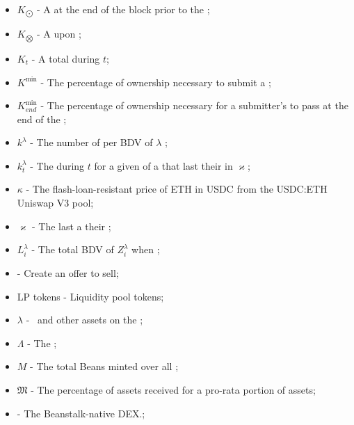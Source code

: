 \documentclass[class=article, crop=false]{standalone}
\begin{document}
\begin{itemize}[topsep=0pt, itemsep=3pt,leftmargin=16pt]
    \item[] $K_{\bigodot}$ - \hypertarget{ht116}{A   at the end of the block prior to the };
    \item[] $K_{\bigotimes}$ - \hypertarget{ht117}{A   upon };
    \item[] $K_t$ - \hypertarget{ht118}{A  total  during $t$};
    \item[] $K^{\text{min}}$ - \hypertarget{ht119}{The percentage of  ownership necessary to submit a };
    \item[] $K_{end}^{\text{min}}$ - The percentage of  ownership necessary for a submitter's  to pass at the end of the ;
    \item[] $k^{\lambda}$ - \hypertarget{ht120}{The number of  per BDV of $\lambda$ };
    \item[] $k_{t}^{\lambda}$ - \hypertarget{ht121}{The  during $t$ for a given  of a  that last  their  in $\varkappa$};
    \item[] $\kappa$ - The flash-loan-resistant price of ETH in USDC from the USDC:ETH Uniswap V3 pool;
    \item[] $\varkappa$ - \hypertarget{ht122}{The last  a   their };
    \item[] $L_i^{\lambda}$ - \hypertarget{ht123}{The total BDV of $Z_i^{\lambda}$ when };
    \item[]  - \hypertarget{ht124}{Create an offer to sell};
    \item[] LP tokens - \hypertarget{ht125}{Liquidity pool tokens};
    \item[] $\lambda$ - \hypertarget{ht126}{\Bean\ and other assets on the };
    \item[] $\Lambda$ - \hypertarget{ht127}{The };
    \item[] $M$ - \hypertarget{ht128}{The total Beans minted over all };
    \item[] $\mathfrak{M}$ - \hypertarget{ht129}{The percentage of  assets received for  a pro-rata portion of  assets};
    \item[]  - \hypertarget{ht130}{The Beanstalk-native DEX.};

\end{itemize}
\end{document}
